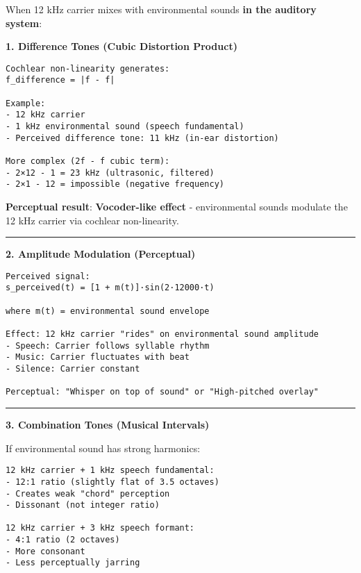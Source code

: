 When 12 kHz carrier mixes with environmental sounds \textbf{in the
auditory system}:

\textbf{1. Difference Tones (Cubic Distortion Product)}

\begin{verbatim}
Cochlear non-linearity generates:
f_difference = |f - f|

Example:
- 12 kHz carrier
- 1 kHz environmental sound (speech fundamental)
- Perceived difference tone: 11 kHz (in-ear distortion)

More complex (2f - f cubic term):
- 2×12 - 1 = 23 kHz (ultrasonic, filtered)
- 2×1 - 12 = impossible (negative frequency)
\end{verbatim}

\textbf{Perceptual result}: \textbf{Vocoder-like effect} - environmental
sounds modulate the 12 kHz carrier via cochlear non-linearity.

\begin{center}\rule{0.5\linewidth}{0.5pt}\end{center}

\textbf{2. Amplitude Modulation (Perceptual)}

\begin{verbatim}
Perceived signal:
s_perceived(t) = [1 + m(t)]·sin(2·12000·t)

where m(t) = environmental sound envelope

Effect: 12 kHz carrier "rides" on environmental sound amplitude
- Speech: Carrier follows syllable rhythm
- Music: Carrier fluctuates with beat
- Silence: Carrier constant

Perceptual: "Whisper on top of sound" or "High-pitched overlay"
\end{verbatim}

\begin{center}\rule{0.5\linewidth}{0.5pt}\end{center}

\textbf{3. Combination Tones (Musical Intervals)}

If environmental sound has strong harmonics:

\begin{verbatim}
12 kHz carrier + 1 kHz speech fundamental:
- 12:1 ratio (slightly flat of 3.5 octaves)
- Creates weak "chord" perception
- Dissonant (not integer ratio)

12 kHz carrier + 3 kHz speech formant:
- 4:1 ratio (2 octaves)
- More consonant
- Less perceptually jarring
\end{verbatim}

